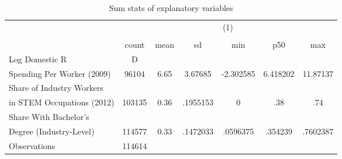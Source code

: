 \begin{table}[htbp]\centering
\def\sym#1{\ifmmode^{#1}\else\(^{#1}\)\fi}
\caption{Sum stats of explanatory variables}
\begin{tabular}{l*{1}{cccccc}}
\toprule
                    &\multicolumn{6}{c}{(1)}                                                      \\
                    &\multicolumn{6}{c}{}                                                         \\
                    &       count&        mean&          sd&         min&         p50&         max\\
\midrule
Log Domestic R&D \\ Spending Per Worker (2009)&       96104&        6.65&     3.67685&   -2.302585&    6.418202&    11.87137\\
Share of Industry Workers \\ in STEM Occupations (2012)&      103135&        0.36&    .1955153&           0&         .38&         .74\\
Share With Bachelor's \\ Degree (Industry-Level)&      114577&        0.33&    .1472033&    .0596375&     .354239&    .7602387\\
\midrule
Observations        &      114614&            &            &            &            &            \\
\bottomrule
\end{tabular}
\end{table}
